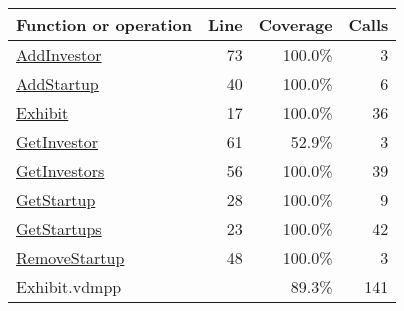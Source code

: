\bigskip
\begin{longtable}{|l|r|r|r|}
\hline
Function or operation & Line & Coverage & Calls \\
\hline
\hline
\hyperref[AddInvestor:73]{AddInvestor} & 73&100.0\% & 3 \\
\hline
\hyperref[AddStartup:40]{AddStartup} & 40&100.0\% & 6 \\
\hline
\hyperref[Exhibit:17]{Exhibit} & 17&100.0\% & 36 \\
\hline
\hyperref[GetInvestor:61]{GetInvestor} & 61&52.9\% & 3 \\
\hline
\hyperref[GetInvestors:56]{GetInvestors} & 56&100.0\% & 39 \\
\hline
\hyperref[GetStartup:28]{GetStartup} & 28&100.0\% & 9 \\
\hline
\hyperref[GetStartups:23]{GetStartups} & 23&100.0\% & 42 \\
\hline
\hyperref[RemoveStartup:48]{RemoveStartup} & 48&100.0\% & 3 \\
\hline
\hline
Exhibit.vdmpp & & 89.3\% & 141 \\
\hline
\end{longtable}

